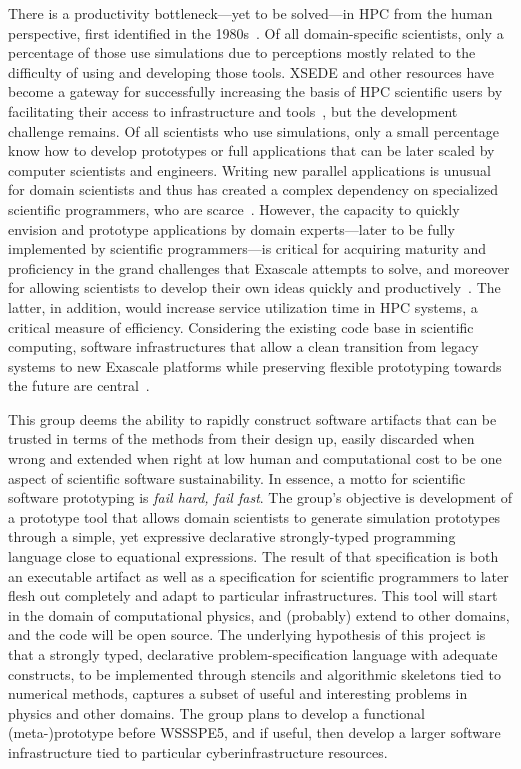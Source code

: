 \documentclass[11pt, oneside]{amsart}
\begin{document}
There is a productivity bottleneck---yet to be solved---in HPC from the human
perspective, first identified in the 1980s~\cite{barstow1982automatic}. Of all
domain-specific scientists, only a percentage of those use simulations due to
perceptions mostly related to the difficulty of using and developing those tools.
XSEDE and other resources have become a gateway for successfully increasing the
basis of HPC scientific users by facilitating their access to infrastructure and
tools~\cite{towns2014xsede}, but the development challenge remains.
Of all scientists who use simulations, only a small percentage know how
to develop prototypes or full applications that can be later scaled by computer
scientists and engineers. Writing new parallel applications is unusual for
domain scientists and thus has created a complex dependency on specialized
scientific programmers, who are scarce~\cite{post2005computational}. However,
the capacity to quickly envision and prototype applications by domain
experts---later to be fully implemented by scientific programmers---is critical for
acquiring maturity and proficiency in the grand challenges that Exascale
attempts to solve, and moreover for allowing scientists to develop their own
ideas quickly and productively~\cite{vinter2015prototyping}. The latter, in
addition, would increase service utilization time in HPC systems, a critical
measure of efficiency. Considering the existing code base in scientific
computing, software infrastructures that allow a clean transition from legacy
systems to new Exascale platforms while preserving flexible prototyping
towards the future are central~\cite{hwu2015transitioning}.

This group deems the ability to rapidly construct software artifacts that can be
trusted in terms of the methods from their design up, easily discarded when
wrong and extended when right at low human and computational cost to be one
aspect of scientific software sustainability. In essence,
a motto for scientific software prototyping is \textit{fail hard, fail fast}.
%
The group's objective is development of a prototype tool that allows domain scientists to generate
simulation prototypes through a simple, yet expressive declarative
strongly-typed programming language close to equational expressions. The result
of that specification is both an executable artifact as well as a specification
for scientific programmers to later flesh out completely and adapt to particular
infrastructures. This tool will start in the domain of computational physics,
and (probably) extend to other domains, and the code will be open source.
%
The underlying hypothesis of this project is that a strongly typed, declarative
problem-specification language with adequate constructs, to be implemented
through stencils and algorithmic skeletons tied to numerical methods, captures a
 subset of useful and interesting problems in physics and other domains.
%
The group plans to develop a functional (meta-)prototype before WSSSPE5, and
if useful, then develop a larger software infrastructure tied to
particular cyberinfrastructure resources.
\end{document}
